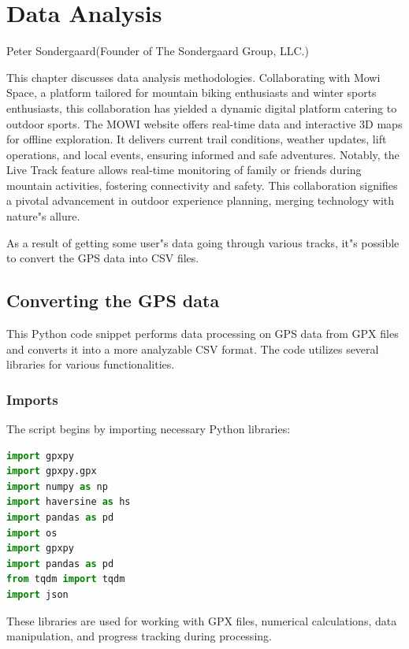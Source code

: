 %
\chapter{Data Analysis}
\label{sec:data}

{Peter Sondergaard}{(Founder of The Sondergaard Group, LLC.)}


This chapter discusses data analysis methodologies. Collaborating with Mowi Space, a platform tailored for mountain biking enthusiasts and winter sports enthusiasts, this collaboration has yielded a dynamic digital platform catering to outdoor sports. The MOWI website offers real-time data and interactive 3D maps for offline exploration. It delivers current trail conditions, weather updates, lift operations, and local events, ensuring informed and safe adventures. Notably, the Live Track feature allows real-time monitoring of family or friends during mountain activities, fostering connectivity and safety. This collaboration signifies a pivotal advancement in outdoor experience planning, merging technology with nature"s allure.

As a result of getting some user"s data going through various tracks,
it"s possible to convert the GPS data into CSV files.


\section{Converting the GPS data}
\label{sec:data-gps}

This Python code snippet performs data processing on GPS data from GPX files and converts it into 
a more analyzable CSV format. The code utilizes several libraries for various functionalities.

\subsection{Imports}

The script begins by importing necessary Python libraries:

\begin{lstlisting}[language=Python]
import gpxpy
import gpxpy.gpx
import numpy as np
import haversine as hs
import pandas as pd
import os
import gpxpy
import pandas as pd
from tqdm import tqdm
import json
\end{lstlisting}

These libraries are used for working with GPX files, numerical calculations, data manipulation, and progress tracking during processing.

